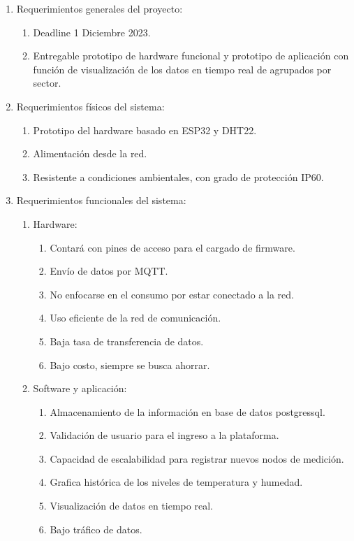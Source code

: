 \documentclass[
11pt, %
codirector, %
]{charter}
\begin{document}
\begin{enumerate}
	\item Requerimientos generales del proyecto:
	\begin{enumerate}
	\item Deadline 1 Diciembre 2023.
	\item Entregable prototipo de hardware funcional y prototipo de aplicación con función de visualización de los datos en tiempo real de agrupados por sector.
	\end{enumerate}
\item Requerimientos físicos del sistema:
	\begin{enumerate}
	\item Prototipo del hardware basado en ESP32 y DHT22.
	\item Alimentación desde la red.
	\item Resistente a condiciones ambientales, con grado de protección IP60.
	\end{enumerate}
\item Requerimientos funcionales del sistema:
	\begin{enumerate}
	\item Hardware:
		\begin{enumerate}
		\item Contará con pines de acceso para el cargado de firmware.
		\item Envío de datos por MQTT.
		\item No enfocarse en el consumo por estar conectado a la red.
		\item Uso eficiente de la red de comunicación.
		\item Baja tasa de transferencia de datos.
		\item Bajo costo, siempre se busca ahorrar.
		\end{enumerate}
	\item Software y aplicación:
		\begin{enumerate}
		\item Almacenamiento de la información en base de datos postgressql.
		\item Validación de usuario para el ingreso a la plataforma.
		\item Capacidad de escalabilidad para registrar nuevos nodos de medición.
		\item Grafica histórica de los niveles de temperatura y humedad.
		\item Visualización de datos en tiempo real.
		\item Bajo tráfico de datos.

\end{enumerate}
\end{enumerate}
\end{enumerate}
\end{document}
